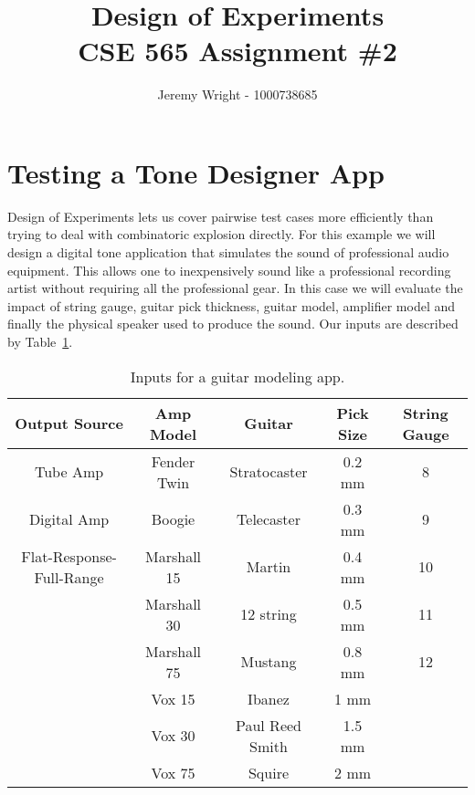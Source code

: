\documentclass[12pt,journal]{article}
\begin{document}
\doublespace
\title{Design of Experiments \\ CSE 565 Assignment \#2}
\author{Jeremy Wright - 1000738685}

\maketitle

\section{Testing a Tone Designer App}
Design of Experiments lets us cover pairwise test cases more efficiently than
trying to deal with combinatoric explosion directly. For this example we will
design a digital tone application that simulates the sound of professional audio
equipment. This allows one to inexpensively sound like a professional recording
artist without requiring all the professional gear.  In this case we will
evaluate the impact of string gauge, guitar pick thickness, guitar model,
amplifier model and finally the physical speaker used to produce the sound. Our
inputs are described by Table~\ref{tab:inputs}.

\begin{table}
    \centering
    \caption{Inputs for a guitar modeling app.}
    \label{tab:inputs}
    \begin{tabular}{c | c | c | c | c }
        \hline
        Output Source & Amp Model & Guitar  & Pick Size  &  String Gauge \\
        \hline \hline 
  Tube Amp                          & Fender Twin & Stratocaster    & 0.2 mm & 8\\
  Digital Amp                       & Boogie      & Telecaster      & 0.3 mm & 9\\
  Flat-Response-Full-Range          & Marshall 15 & Martin          & 0.4 mm & 10\\
                                    & Marshall 30 & 12 string       & 0.5 mm & 11\\
                                    & Marshall 75 & Mustang         & 0.8 mm & 12\\
                                    & Vox 15      & Ibanez          & 1 mm   & \\
                                    & Vox 30      & Paul Reed Smith & 1.5 mm & \\
                                    & Vox 75      & Squire          & 2 mm   & \\
                            
        \hline
    \end{tabular}
\end{table}
\end{document}
